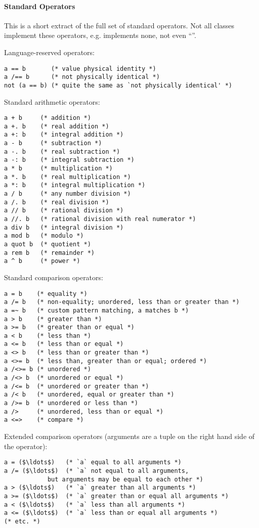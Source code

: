 \paragraph{Standard Operators}

This is a short extract of the full set of standard operators. Not all classes implement these operators, e.g.  implements none, not even ``\code{=}''. 

Language-reserved operators:
\begin{lstlisting}
a == b       (* value physical identity *)
a /== b      (* not physically identical *)
not (a == b) (* quite the same as `not physically identical' *)
\end{lstlisting}

Standard arithmetic operators:
\begin{lstlisting}
a + b     (* addition *)
a +. b    (* real addition *)
a +: b    (* integral addition *)
a - b     (* subtraction *)
a -. b    (* real subtraction *)
a -: b    (* integral subtraction *)
a * b     (* multiplication *)
a *. b    (* real multiplication *)
a *: b    (* integral multiplication *)
a / b     (* any number division *)
a /. b    (* real division *)
a // b    (* rational division *)
a //. b   (* rational division with real numerator *)
a div b   (* integral division *)
a mod b   (* modulo *)
a quot b  (* quotient *)
a rem b   (* remainder *)
a ^ b     (* power *)
\end{lstlisting}

Standard comparison operators:
\begin{lstlisting}
a = b    (* equality *)
a /= b   (* non-equality; unordered, less than or greater than *)
a =~ b   (* custom pattern matching, a matches b *)
a > b    (* greater than *)
a >= b   (* greater than or equal *)
a < b    (* less than *)
a <= b   (* less than or equal *)
a <> b   (* less than or greater than *)
a <>= b  (* less than, greater than or equal; ordered *)
a /<>= b (* unordered *)
a /<> b  (* unordered or equal *)
a /<= b  (* unordered or greater than *)
a /< b   (* unordered, equal or greater than *)
a />= b  (* unordered or less than *)
a />     (* unordered, less than or equal *)
a <=>    (* compare *)
\end{lstlisting}

Extended comparison operators (arguments are a tuple on the right hand side of the operator):
\begin{lstlisting}
a = ($\ldots$)   (* `a` equal to all arguments *)
a /= ($\ldots$)  (* `a` not equal to all arguments,
            but arguments may be equal to each other *)
a > ($\ldots$)   (* `a` greater than all arguments *)
a >= ($\ldots$)  (* `a` greater than or equal all arguments *)
a < ($\ldots$)   (* `a` less than all arguments *)
a <= ($\ldots$)  (* `a` less than or equal all arguments *)
(* etc. *)
\end{lstlisting}

